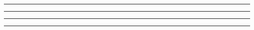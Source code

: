 \begin{appendices}
{\newpage

\rule{0.975\textwidth}{.6pt}
\label{code:lab2}
\rule{0.975\textwidth}{.4pt}

\vspace{15pt}

\rule{0.975\textwidth}{.6pt}
\label{code:transpose}

\newpage
\vspace{-50pt}
\rule{0.975\textwidth}{.6pt}
\label{code:utility}
}

\end{appendices}